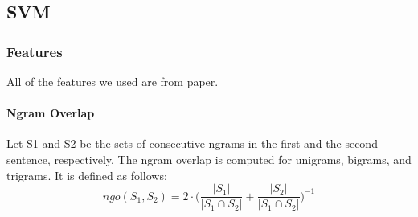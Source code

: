 \documentclass[10pt, a4paper]{article}
\begin{document}
\begin{table}[h!]
%
%
%

\newpage
\subsection{SVM}

\subsubsection{Features}
All of the features we used are from \citep{Saric2012TakeLabSF} paper.
\paragraph{Ngram Overlap \\}
Let S1 and S2 be the sets of consecutive ngrams in the first and the second sentence, respectively. The ngram overlap is computed for unigrams, bigrams, and trigrams. It is defined as follows:
\begin{equation}\label{eq:ngo}
ngo(S_1, S_2) = 2 \cdot \bigg( \frac{|S_1|}{|S_1 \cap S_2|}+\frac{|S_2|}{|S_1 \cap S_2|}\bigg)^{-1}
\end{equation}


\end{table}
\end{document}
